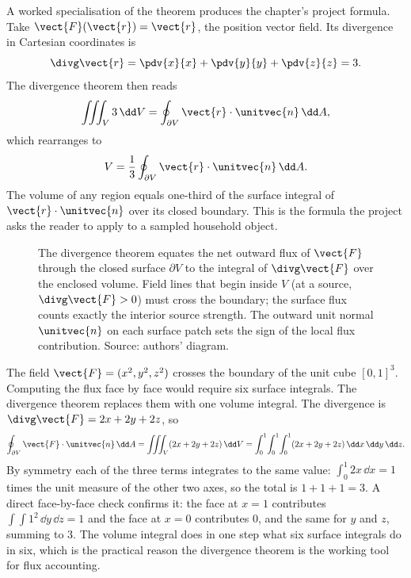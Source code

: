 A worked specialisation of the theorem produces the chapter's
project formula. Take $\vect{F}(\vect{r}) = \vect{r}$, the position
vector field. Its divergence in Cartesian coordinates is
\[
\divg\vect{r} = \pdv{x}{x} + \pdv{y}{y} + \pdv{z}{z} = 3.
\]
The divergence theorem then reads
\[
\iiint_{V} 3 \,\dd V = \oint_{\partial V} \vect{r} \cdot \unitvec{n}
\,\dd A,
\]
which rearranges to
\[
V = \frac{1}{3} \oint_{\partial V} \vect{r} \cdot \unitvec{n} \,\dd A.
\]
The volume of any region equals one-third of the surface integral of
$\vect{r} \cdot \unitvec{n}$ over its closed boundary. This is the
formula the project asks the reader to apply to a sampled household
object.

\begin{figure}[h]
  \centering
  
  \caption[Flux of a vector field through a closed surface.]{The
  divergence theorem equates the net outward flux of $\vect{F}$
  through the closed surface $\partial V$ to the integral of
  $\divg\vect{F}$ over the enclosed volume. Field lines that begin
  inside $V$ (at a source, $\divg\vect{F} > 0$) must cross the
  boundary; the surface flux counts exactly the interior source
  strength. The outward unit normal $\unitvec{n}$ on each surface
  patch sets the sign of the local flux contribution. Source:
  authors' diagram.}
  \label{fig:vol02:ch08:flux-surface}
\end{figure}

\begin{example}
The field $\vect{F} = (x^{2}, y^{2}, z^{2})$ crosses the boundary of
the unit cube $[0, 1]^{3}$. Computing the flux face by face would
require six surface integrals. The divergence theorem replaces them
with one volume integral. The divergence is $\divg\vect{F} = 2x +
2y + 2z$, so
\[
\oint_{\partial V}\vect{F}\cdot\unitvec{n}\,\dd A =
\iiint_{V}(2x + 2y + 2z)\,\dd V = \int_{0}^{1}\!\int_{0}^{1}\!
\int_{0}^{1}(2x + 2y + 2z)\,\dd x\,\dd y\,\dd z.
\]
By symmetry each of the three terms integrates to the same value:
$\int_{0}^{1}2x\,\dd x = 1$ times the unit measure of the other two
axes, so the total is $1 + 1 + 1 = 3$. A direct face-by-face check
confirms it: the face at $x = 1$ contributes $\int\!\int 1^{2}\,
\dd y\,\dd z = 1$ and the face at $x = 0$ contributes $0$, and the
same for $y$ and $z$, summing to $3$. The volume integral does in one
step what six surface integrals do in six, which is the practical
reason the divergence theorem is the working tool for flux
accounting.
\end{example}

